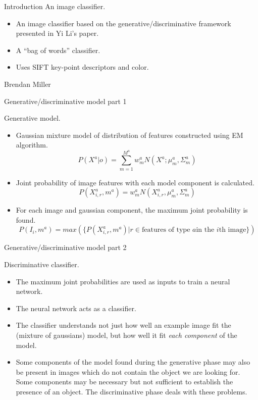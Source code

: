 \documentclass{beamer}
\begin{document}
\begin{frame}{Introduction}
  An image classifier.
\begin{itemize}
  \item An image classifier based on the generative/discriminative framework
  presented in Yi Li's paper.
  \item A ``bag of words'' classifier.
  \item Uses SIFT key-point descriptors and color.
\end{itemize}

Brendan Miller

\end{frame}

\begin{frame}{Generative/discriminative model part 1}

Generative model.

\begin{itemize}
  \item Gaussian mixture model of distribution of features constructed using EM algorithm.
    \begin{equation*}
      P(X^a|o) = \sum_{m=1}^{M^a} w^a_m N(X^a; \mu^a_m, \Sigma^a_m)
    \end{equation*}
  \item Joint probability of image features with each model component is calculated.
    \begin{equation*}
      P(X^a_{i,r},m^a) = w^a_m N(X^a_{i,r}, \mu^a_m, \Sigma^a_m)
    \end{equation*}
  \item For each image and gaussian component, the maximum joint probability is found.
    \begin{equation*}
      P(I_i, m^a) = max(\{P(X^a_{i,r}, m^a)|r \in \mbox{features of type $a$
        in the $i$th image\}})
    \end{equation*}

\end{itemize}  

\end{frame}

\begin{frame}{Generative/discriminative model part 2}

Discriminative classifier.

\begin{itemize}
  \item The maximum joint probabilities are used as inputs to train a neural network.
  \item The neural network acts as a classifier.
  \item The classifier understands not just how well an example image
    fit the (mixture of gaussians) model, but how well it fit
    \emph{each component} of the model.
  \item Some components of the model found during the generative phase
    may also be present in images which do not contain the object we
    are looking for. Some components may be necessary but not
    sufficient to establish the presence of an object. The
    discriminative phase deals with these problems.
\end{itemize}
\end{frame}
\end{document}
